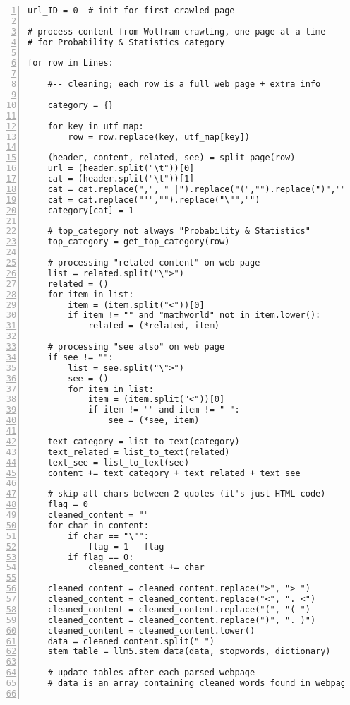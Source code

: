 \documentclass[oneside,10pt]{book}
\begin{document}
\begin{lstlisting}[numbers=left]
url_ID = 0  # init for first crawled page

# process content from Wolfram crawling, one page at a time
# for Probability & Statistics category

for row in Lines:

    #-- cleaning; each row is a full web page + extra info

    category = {}

    for key in utf_map:
        row = row.replace(key, utf_map[key])

    (header, content, related, see) = split_page(row)
    url = (header.split("\t"))[0] 
    cat = (header.split("\t"))[1]
    cat = cat.replace(",", " |").replace("(","").replace(")","")
    cat = cat.replace("'","").replace("\"","")
    category[cat] = 1

    # top_category not always "Probability & Statistics"
    top_category = get_top_category(row)

    # processing "related content" on web page
    list = related.split("\">")
    related = ()
    for item in list:
        item = (item.split("<"))[0]
        if item != "" and "mathworld" not in item.lower():
            related = (*related, item)

    # processing "see also" on web page
    if see != "":
        list = see.split("\">")
        see = ()
        for item in list:
            item = (item.split("<"))[0]
            if item != "" and item != " ":
                see = (*see, item)
   
    text_category = list_to_text(category)
    text_related = list_to_text(related)
    text_see = list_to_text(see)
    content += text_category + text_related + text_see

    # skip all chars between 2 quotes (it's just HTML code)
    flag = 0
    cleaned_content = ""
    for char in content:
        if char == "\"":
            flag = 1 - flag
        if flag == 0:
            cleaned_content += char

    cleaned_content = cleaned_content.replace(">", "> ")
    cleaned_content = cleaned_content.replace("<", ". <")
    cleaned_content = cleaned_content.replace("(", "( ")
    cleaned_content = cleaned_content.replace(")", ". )")
    cleaned_content = cleaned_content.lower()
    data = cleaned_content.split(" ")
    stem_table = llm5.stem_data(data, stopwords, dictionary)

    # update tables after each parsed webpage
    # data is an array containing cleaned words found in webpage


\end{lstlisting}
\end{document}
